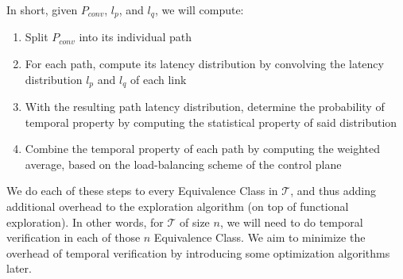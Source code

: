 \documentclass[10pt,sigconf,letterpaper,anonymous,nonacm]{acmart}
\begin{document}
In short, given $P_{conv}$, $l_p$, and $l_q$, we will compute:
\begin{enumerate}
    \item Split $P_{conv}$ into its individual path
    \item For each path, compute its latency distribution by convolving the latency distribution 
        $l_p$ and $l_q$ of each link
    \item With the resulting path latency distribution, determine the probability of temporal 
        property by computing the statistical property of said distribution
    \item Combine the temporal property of each path by computing the weighted average, based 
        on the load-balancing scheme of the control plane
\end{enumerate}

We do each of these steps to every Equivalence Class in $\mathcal{T}$, and thus adding additional 
overhead to the exploration algorithm (on top of functional exploration).
In other words, for $\mathcal{T}$ of size $n$, we will need to do temporal verification in each of 
those $n$ Equivalence Class.
We aim to minimize the overhead of temporal verification by introducing some optimization algorithms
later.


\end{document}
